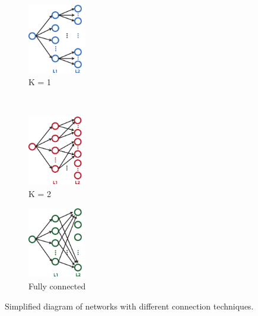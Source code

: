 \documentclass{article} %
\begin{document}
\begin{figure}
        \centering
         \label{fig-secondconnex}
        \begin{subfigure}[b]{0.3\textwidth}
                \centering
                \includegraphics[width=1.0in]{fig-diagram-fanin1.pdf}
                \caption{K = 1}
                \label{fig-secondconnex-fanin1}
        \end{subfigure}%
        ~%
          \begin{subfigure}[b]{0.3\textwidth}
                \centering
                \includegraphics[width=1.0in]{fig-diagram-fanin2.pdf}
                \caption{K = 2}
                \label{fig-secondconnex-fanin2}                
        \end{subfigure}%
        \begin{subfigure}[b]{0.3\textwidth}
                \centering
                \includegraphics[width=1.0in]{fig-diagram-faninall.pdf}
                \caption{Fully connected}
                \label{fig-secondconnex-full}
        \end{subfigure}
        \caption{Simplified diagram of networks with different connection techniques.}
\end{figure}
\end{document}

